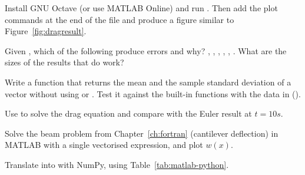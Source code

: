 \begin{exercises}
\item Install GNU Octave (or use MATLAB Online) and run . Then add the plot
  commands at the end of the file and produce a figure similar to
  Figure~\ref{fig:dragresult}.
\item Given , which of the following produce errors and why?
  , , , , , .
  What are the sizes of the results that do work?
\item Write a function  that returns the mean and the sample
  standard deviation of a vector without using  or . Test it against the
  built-in functions with the data in  ().
\item Use  to solve the drag equation and compare with the Euler result at
  $t = 10\unit{s}$.
\item Solve the beam problem from Chapter~\ref{ch:fortran} (cantilever deflection) in
  MATLAB with a single vectorised expression, and plot $w(x)$.
\item Translate  into \py with NumPy, using
  Table~\ref{tab:matlab-python}.
\end{exercises}
